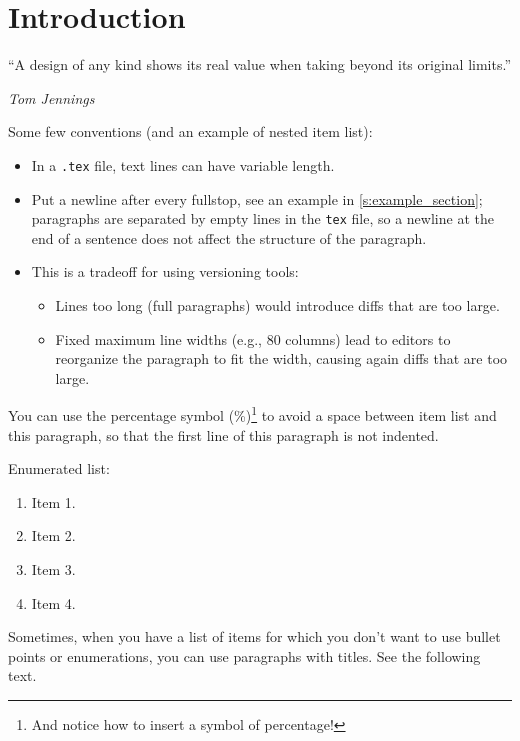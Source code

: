 \chapter{Introduction}
\label{c:intro}

%
%

\epigraph{\enquote{A design of any kind shows its real value when taking beyond its original limits.}}{\emph{Tom Jennings}}

Some few conventions (and an example of nested item list):

\begin{itemize}
\item In a \texttt{.tex} file, text lines can have variable length.
\item Put a newline after every fullstop, see an example in \cref{s:example_section}; paragraphs are separated by empty lines in the \texttt{tex} file, so a newline at the end of a sentence does not affect the structure of the paragraph.
\item This is a tradeoff for using versioning tools:
\begin{itemize}
\item Lines too long (full paragraphs) would introduce diffs that are too large.
\item Fixed maximum line widths (e.g., $80$ columns) lead to editors to reorganize the paragraph to fit the width, causing again diffs that are too large.
\end{itemize}
\end{itemize}
%
You can use the percentage symbol (\%)\footnote{And notice how to insert a symbol of percentage!} to avoid a space between item list and this paragraph, so that the first line of this paragraph is not indented.

Enumerated list:

\begin{enumerate}
\item Item 1.
\item Item 2.
\item Item 3.
\item Item 4.
\end{enumerate}

Sometimes, when you have a list of items for which you don't want to use bullet points or enumerations, you can use paragraphs with titles.
See the following text.

